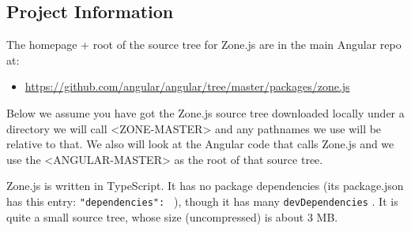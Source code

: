 \subsection{Project Information}

The homepage + root of the source tree for Zone.js are in the main Angular repo at:

\begin{itemize}
  \item \url{https://github.com/angular/angular/tree/master/packages/zone.js}
\end{itemize}

Below we assume you have got the Zone.js source tree downloaded locally under a
directory we will call <ZONE-MASTER> and any pathnames we use will be relative to
that. We also will look at the Angular code that calls Zone.js and we use the
<ANGULAR-MASTER> as the root of that source tree.

Zone.js is written in TypeScript. It has no package dependencies (its package.json has
this entry:
\texttt{"dependencies": {}}
), though it has many
\texttt{devDependencies}
. It is quite a
small source tree, whose size (uncompressed) is about 3 MB.
